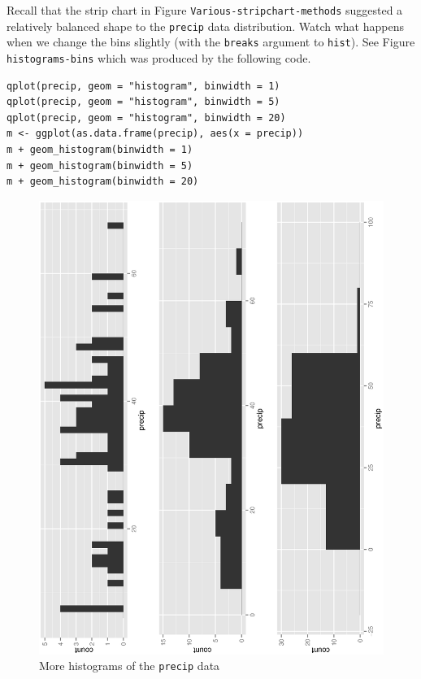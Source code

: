 \documentclass[10pt,english]{scrbook}
\begin{document}
\begin{exampletoo}

Recall that the strip chart in Figure \texttt{Various-stripchart-methods} suggested a relatively balanced shape to the \texttt{precip} data distribution. Watch what happens when we change the bins slightly (with the \texttt{breaks} argument to \texttt{hist}). See Figure \texttt{histograms-bins} which was produced by the following code.


\begin{verbatim}
qplot(precip, geom = "histogram", binwidth = 1)
qplot(precip, geom = "histogram", binwidth = 5)
qplot(precip, geom = "histogram", binwidth = 20)
m <- ggplot(as.data.frame(precip), aes(x = precip))
m + geom_histogram(binwidth = 1)
m + geom_histogram(binwidth = 5)
m + geom_histogram(binwidth = 20)
\end{verbatim}

\begin{figure}[th]
  \includegraphics[angle=270, totalheight=4in]{ps/datadesc/histograms-bins.ps}
  \caption{More histograms of the \texttt{precip} data}
  \label{fig-histograms-bins}
\end{figure}



\end{exampletoo}
\end{document}
